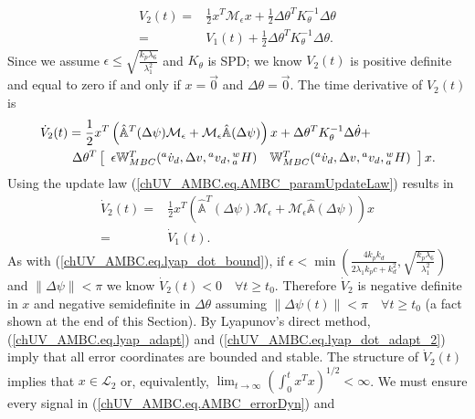 %
\begin{align} \label{chUV_AMBC.eq.lyap_adapt}
V_2(t)=&\frac{1}{2} x^T\mathcal{M}_\epsilon x 
    +\frac{1}{2}\Delta\theta^T K_\theta^{-1} \Delta \theta
\nonumber \\
=&V_1(t) + \frac{1}{2}\Delta\theta^T K_\theta^{-1} \Delta \theta.
\end{align}
%
Since we assume $\epsilon \leq \sqrt{\frac{k_p
    \lambda_6}{\lambda_1^{2}}}$ and $K_\theta$ is \ac{SPD}; we know
$V_2(t)$ is positive definite and equal 
to zero if and only if $x=\vec{0}$ and $\Delta \theta=\vec{0}$.
The time derivative of $V_2(t)$ is 
%
\begin{align}
\dot{V}_2(t)
&=\frac{1}{2}
x^T\left(\hat{\mathbb{A}}^{T}(\Delta\psi)\mathcal{M}_\epsilon 
        +\mathcal{M}_\epsilon\hat{\mathbb{A}}(\Delta\psi)\right) x
        +\Delta\theta^T K_\theta^{-1} \Delta\dot{ \theta}+
\nonumber \\
&~\Delta \theta^T \left[\begin{array}{cc}
   \epsilon \mathbb{W}_{MBC}^{T}({^a}\dot{v}_d,\Delta v, {^a}v_d ,
      {^w_a}H) & \mathbb{W}_{MBC}^{T}({^a}\dot{v}_d,\Delta v, {^a}v_d ,
      {^w_a}H)
   \end{array} \right] x.
 \label{chUV_AMBC.eq.lyap_dot_adapt_1}  
\end{align}
%
Using the update law (\ref{chUV_AMBC.eq.AMBC_paramUpdateLaw}) results
in
%
\begin{align} 
\dot{V}_2(t)=&\frac{1}{2}
x^T\left(\hat{\mathbb{A}}^{T}(\Delta\psi)\mathcal{M}_\epsilon 
        +\mathcal{M}_\epsilon\hat{\mathbb{A}}(\Delta\psi)\right) x
\nonumber \\
    =&\dot{V}_1(t).
\label{chUV_AMBC.eq.lyap_dot_adapt_2}  
\end{align}
%
As with (\ref{chUV_AMBC.eq.lyap_dot_bound}), if
$\epsilon<\min\left(\frac{4 k_p k_d}{2 \lambda_1 k_p c
    +k_d^2},\sqrt{\frac{k_p \lambda_6}{\lambda_1^{2}}} \right)$ and
$\|\Delta\psi\|<\pi$ we know
$\dot{V}_2(t)<0\quad\forall t \geq t_0$.  
%
Therefore $\dot{V}_2$ is
negative definite in $x$ and negative semidefinite in $\Delta \theta$
assuming $\|\Delta\psi(t)\|<\pi\quad \forall t\geq t_0$ (a fact
shown at the end of this Section).  
%
By Lyapunov's direct method, (\ref{chUV_AMBC.eq.lyap_adapt}) and
(\ref{chUV_AMBC.eq.lyap_dot_adapt_2}) imply that all error coordinates
are bounded and stable.
%
The structure of $\dot{V}_2(t)$ implies that
$x \in \mathcal{L}_2$ or, equivalently, $\lim_{t\to\infty}\left(
  \int_0^tx^T x \right)^{1/2}<\infty$.  
%
We must ensure every signal in (\ref{chUV_AMBC.eq.AMBC_errorDyn}) and
